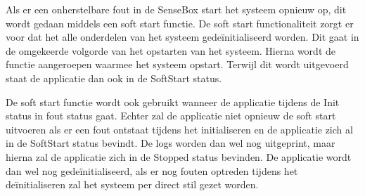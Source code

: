 Als er een onherstelbare fout in de SenseBox start het systeem opnieuw op, dit wordt gedaan middels een soft start functie. De soft start functionaliteit zorgt er voor dat het alle onderdelen van het systeem gedeïnitialiseerd worden. Dit gaat in de omgekeerde volgorde van het opstarten van het systeem. Hierna wordt de functie aangeroepen waarmee het systeem opstart. Terwijl dit wordt uitgevoerd staat de applicatie dan ook in de SoftStart status.

\vspace{1em}
De soft start functie wordt ook gebruikt wanneer de applicatie tijdens de Init status in fout status gaat. Echter zal de applicatie niet opnieuw de soft start uitvoeren als er een fout ontstaat tijdens het initialiseren en de applicatie zich al in de SoftStart status bevindt. De logs worden dan wel nog uitgeprint, maar hierna zal de applicatie zich in de Stopped status bevinden. De applicatie wordt dan wel nog gedeïnitialiseerd, als er nog fouten optreden tijdens het deïnitialiseren zal het systeem per direct stil gezet worden.
